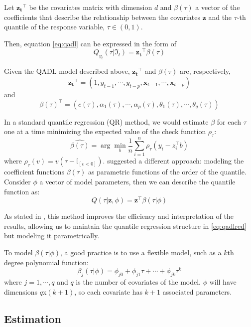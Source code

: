 \documentclass[aoas]{imsart}
\numberwithin{equation}{section}
\theoremstyle{plain}
\theoremstyle{remark}
\begin{document}
Let \(\mathbf{z_t}^\intercal\) be the covariates matrix with dimension
\(d\) and \(\beta(\tau)\) a vector of the coefficients that describe the
relationship between the covariates \(\mathbf{z}\) and the \(\tau\)-th
quantile of the response variable, \(\tau \in (0,1)\).

Then, equation \ref{eq:qadl} can be expressed in the form of
\begin{equation}
Q_{y_t}(\tau|\Im_t) = \mathbf{z_t}^\intercal\beta(\tau)
\label{eq:qadlred}
\end{equation}

Given the QADL model described above, \(\mathbf{z_t}^\intercal\) and
\(\beta(\tau)\) are, respectively, \[
\mathbf{z_t}^\intercal = (1, y_{t-1}, \cdots, y_{t-p}, \mathbf{x}_{t-1}, \cdots, \mathbf{x}_{t-p})
\] and \[
\beta(\tau)^\intercal = (c(\tau), \alpha_1(\tau), \cdots, \alpha_p(\tau), \theta_1(\tau), \cdots , \theta_q(\tau))
\]

In a standard quantile regression (QR) method, we would estimate
\(\beta\) for each \(\tau\) one at a time minimizing the expected value
of the check function \(\rho_\tau\): \[
\hat{\beta(\tau)} = \arg\min_b \frac{1}{n}\sum_{i=1}^n{\rho_\tau(y_i - z_i^\intercal b)}
\] where \(\rho_\tau(v) = v(\tau - \mathbb{I}_{[v<0]})\).
\citet{Frumento2016} suggested a different approach: modeling the
coefficient functions \(\beta(\tau)\) as parametric functions of the
order of the quantile. Consider \(\phi\) a vector of model parameters,
then we can describe the quantile function as: \begin{equation}
Q(\tau|\mathbf{z},\phi) = \mathbf{z}^\intercal\beta(\tau|\phi)
\label{eq:qrcm}
\end{equation}

As stated in \citet{Sottile2020}, this method improves the efficiency
and interpretation of the results, allowing us to maintain the quantile
regression structure in \ref{eq:qadlred} but modeling it parametrically.

To model \(\beta(\tau|\phi)\), a good practice is to use a flexible
model, such as a \(k\)th degree polynomial function: \[
\beta_j(\tau|\phi) = \phi_{j0} + \phi_{j1}\tau + \cdots + \phi_{jk}\tau^k
\] where \(j = 1, \cdots,q\) and \(q\) is the number of covariates of
the model. \(\phi\) will have dimensions \(q\)x\((k+1)\), so each
covariate has \(k+1\) associated parameters.

\hypertarget{estimation}{%
\subsection{Estimation}\label{estimation}}
\end{document}
